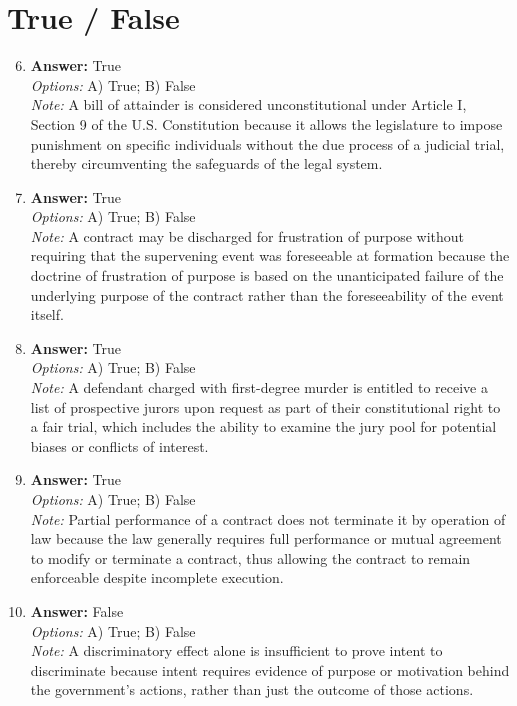 \documentclass[12pt]{article}
\begin{document}
\section*{True / False}
\begin{enumerate}[label=\arabic*.]
\setcounter{enumi}{5}
\item \textbf{Answer:} True
\\ \textit{Options:} A) True; B) False
\\ \textit{Note:} A bill of attainder is considered unconstitutional under Article I, Section 9 of the U.S. Constitution because it allows the legislature to impose punishment on specific individuals without the due process of a judicial trial, thereby circumventing the safeguards of the legal system.
\item \textbf{Answer:} True
\\ \textit{Options:} A) True; B) False
\\ \textit{Note:} A contract may be discharged for frustration of purpose without requiring that the supervening event was foreseeable at formation because the doctrine of frustration of purpose is based on the unanticipated failure of the underlying purpose of the contract rather than the foreseeability of the event itself.
\item \textbf{Answer:} True
\\ \textit{Options:} A) True; B) False
\\ \textit{Note:} A defendant charged with first-degree murder is entitled to receive a list of prospective jurors upon request as part of their constitutional right to a fair trial, which includes the ability to examine the jury pool for potential biases or conflicts of interest.
\item \textbf{Answer:} True
\\ \textit{Options:} A) True; B) False
\\ \textit{Note:} Partial performance of a contract does not terminate it by operation of law because the law generally requires full performance or mutual agreement to modify or terminate a contract, thus allowing the contract to remain enforceable despite incomplete execution.
\item \textbf{Answer:} False
\\ \textit{Options:} A) True; B) False
\\ \textit{Note:} A discriminatory effect alone is insufficient to prove intent to discriminate because intent requires evidence of purpose or motivation behind the government's actions, rather than just the outcome of those actions.
\end{enumerate}
\end{document}
